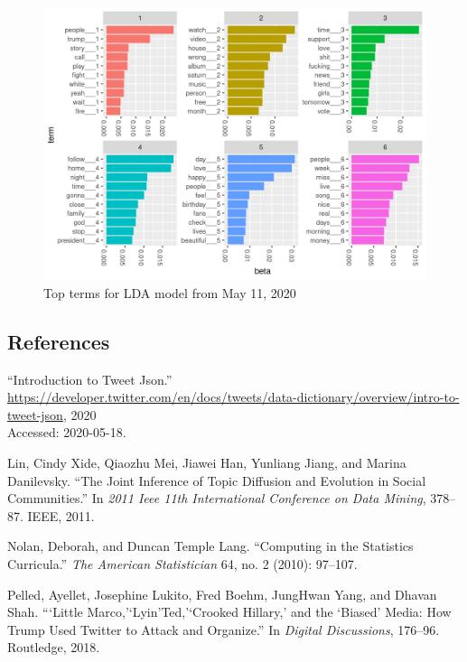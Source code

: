 \documentclass[
]{article}
\begin{document}
\begin{figure}
\includegraphics[width=29.17in]{../results/beta-2020-05-11} \caption{Top terms for LDA model from May 11, 2020}\label{fig:unnamed-chunk-6}
\end{figure}

\hypertarget{references}{%
\subsection{References}\label{references}}

\hypertarget{refs}{}
\leavevmode\hypertarget{ref-tweet_json}{}%
``Introduction to Tweet Json.''
\url{https://developer.twitter.com/en/docs/tweets/data-dictionary/overview/intro-to-tweet-json},
2020\\
Accessed: 2020-05-18.

\leavevmode\hypertarget{ref-lin2011joint}{}%
Lin, Cindy Xide, Qiaozhu Mei, Jiawei Han, Yunliang Jiang, and Marina
Danilevsky. ``The Joint Inference of Topic Diffusion and Evolution in
Social Communities.'' In \emph{2011 Ieee 11th International Conference
on Data Mining}, 378--87. IEEE, 2011.

\leavevmode\hypertarget{ref-nolan2010computing}{}%
Nolan, Deborah, and Duncan Temple Lang. ``Computing in the Statistics
Curricula.'' \emph{The American Statistician} 64, no. 2 (2010): 97--107.

\leavevmode\hypertarget{ref-pelled2018little}{}%
Pelled, Ayellet, Josephine Lukito, Fred Boehm, JungHwan Yang, and Dhavan
Shah. ```Little Marco,'`Lyin'Ted,'`Crooked Hillary,' and the `Biased'
Media: How Trump Used Twitter to Attack and Organize.'' In \emph{Digital
Discussions}, 176--96. Routledge, 2018.
\end{document}
